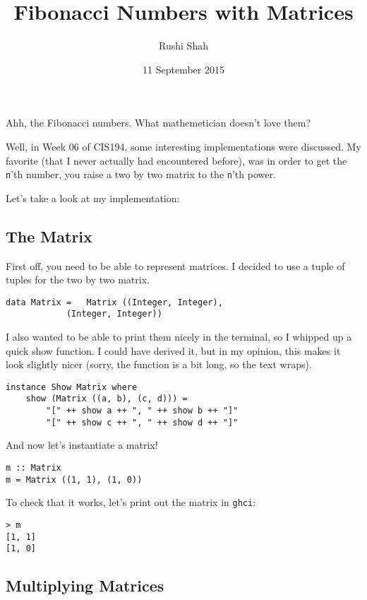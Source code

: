 \documentclass[12pt]{article}
\title{Fibonacci Numbers with Matrices}
\author{Rushi Shah}
\date{11 September 2015}
\begin{document}
	\maketitle
	Ahh, the Fibonacci numbers. What mathemetician doesn't love them?

	Well, in Week 06 of CIS194, some interesting implementations were
	discussed. My favorite (that I never actually had encountered before),
	was in order to get the \texttt{n}'th number, you raise a two by two
	matrix to the \texttt{n}'th power.

	Let's take a look at my implementation:

	\subsection{The Matrix}\label{the-matrix}

	First off, you need to be able to represent matrices. I decided to use a
	tuple of tuples for the two by two matrix.

	\begin{lstlisting}
data Matrix = 	Matrix ((Integer, Integer),
			(Integer, Integer)) 
	\end{lstlisting}

	I also wanted to be able to print them nicely in the terminal, so I
	whipped up a quick show function. I could have derived it, but in my
	opinion, this makes it look slightly nicer (sorry, the function is a bit
	long, so the text wraps).

	\begin{lstlisting}
instance Show Matrix where 
	show (Matrix ((a, b), (c, d))) = 
		"[" ++ show a ++ ", " ++ show b ++ "]"
		"[" ++ show c ++ ", " ++ show d ++ "]"
	\end{lstlisting}

	And now let's instantiate a matrix!

	\begin{lstlisting}
m :: Matrix 
m = Matrix ((1, 1), (1, 0)) 
	\end{lstlisting}

	To check that it works, let's print out the matrix in \texttt{ghci}:

	\begin{lstlisting}
> m
[1, 1]
[1, 0] 
	\end{lstlisting}

	\subsection{Multiplying Matrices}\label{multiplying-matrices}
\end{document}
